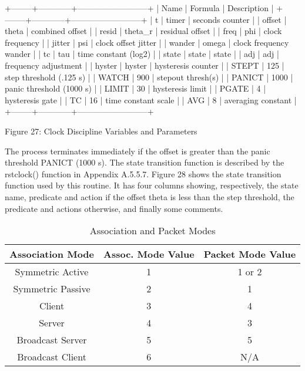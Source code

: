                 +--------+------------+--------------------------+
            | Name   | Formula    | Description              |
            +--------+------------+--------------------------+
            | t      | timer      | seconds counter          |
            | offset | theta      | combined offset          |
            | resid  | theta\_r    | residual offset          |
            | freq   | phi        | clock frequency          |
            | jitter | psi        | clock offset jitter      |
            | wander | omega      | clock frequency wander   |
            | tc     | tau        | time constant (log2)     |
            | state  | state      | state                    |
            | adj    | adj        | frequency adjustment     |
            | hyster | hyster     | hysteresis counter       |
            | STEPT  | 125        | step threshold (.125 s)  |
            | WATCH  | 900        | stepout thresh(s)        |
            | PANICT | 1000       | panic threshold (1000 s) |
            | LIMIT  | 30         | hysteresis limit         |
            | PGATE  | 4          | hysteresis gate          |
            | TC     | 16         | time constant scale      |
            | AVG    | 8          | averaging constant       |
            +--------+------------+--------------------------+

        Figure 27: Clock Discipline Variables and Parameters

The process terminates immediately if the offset is greater than the
panic threshold PANICT (1000 s).  The state transition function is
described by the rstclock() function in Appendix A.5.5.7.  Figure 28
shows the state transition function used by this routine.  It has
four columns showing, respectively, the state name, predicate and
action if the offset theta is less than the step threshold, the
predicate and actions otherwise, and finally some comments.

\begin{table}[htb]
\center
\begin{tabular}{c | c | c}
Association Mode & Assoc. Mode Value & Packet Mode Value \\
\hline
\hline
Symmetric Active & 1 & 1 or 2 \\
Symmetric Passive & 2 & 1 \\
Client & 3 & 4 \\
Server & 4 & 3 \\
Broadcast Server & 5 & 5 \\
Broadcast Client & 6 & N/A \\
\hline
\end{tabular}
\label{association_and_packet_modes}
\caption{Association and Packet Modes}
\end{table}

